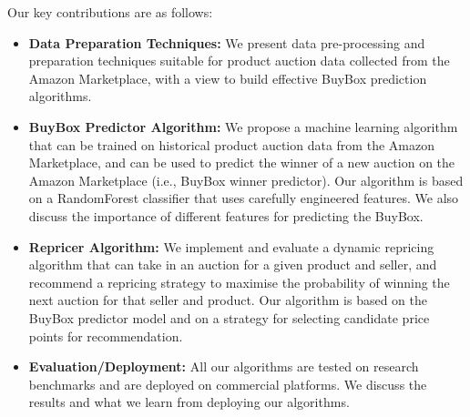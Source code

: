 Our key contributions are as follows:
\begin{itemize}
\item \textbf{Data Preparation Techniques:} We present data pre-processing and preparation techniques suitable for product auction data collected from the Amazon Marketplace, with a view to 
build effective BuyBox prediction algorithms. 
\item	\textbf{BuyBox Predictor Algorithm:} We propose a machine learning algorithm that can be trained on historical product auction data from the Amazon Marketplace, 
and can be used to predict the winner of a new auction on the Amazon Marketplace (i.e., BuyBox winner predictor). 
Our algorithm is based on a RandomForest classifier that uses carefully engineered features.
We also discuss the importance of different features for predicting the BuyBox.

\item \textbf{Repricer Algorithm:} We implement and evaluate a dynamic repricing algorithm that can take in an auction for a given product and seller, 
and recommend a repricing strategy to maximise the probability of winning the next auction for that seller and product.
Our algorithm is based on the BuyBox predictor model and on a strategy for selecting candidate price points for recommendation.

\item \textbf{Evaluation/Deployment:} All our algorithms are tested on research benchmarks and are deployed on commercial platforms.
We discuss the results and what we learn from deploying our algorithms.
\end{itemize}

